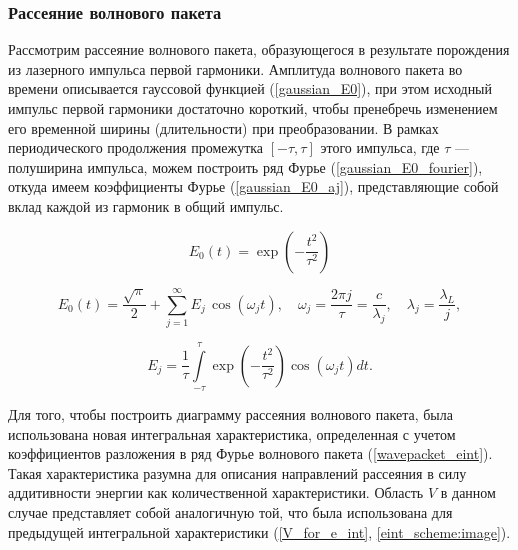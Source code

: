 \subsubsection{Рассеяние волнового пакета}

Рассмотрим рассеяние волнового пакета, образующегося в результате порождения из лазерного импульса первой гармоники. Амплитуда волнового пакета во времени описывается гауссовой функцией (\autoref{gaussian_E0}), при этом исходный импульс первой гармоники достаточно короткий, чтобы пренебречь изменением его временной ширины (длительности) при преобразовании. В рамках периодического продолжения промежутка $[-\tau, \tau]$ этого импульса, где $\tau$ --- полуширина импульса, можем построить ряд Фурье (\autoref{gaussian_E0_fourier}), откуда имеем коэффициенты Фурье (\autoref{gaussian_E0_aj}), представляющие собой вклад каждой из гармоник в общий импульс.

    \begin{equation}
        E_0\left( t \right) = \exp{\left( - \frac{t^2}{\tau^2}\right)}
        \label{gaussian_E0}
    \end{equation}

    \begin{equation}
        E_0\left( t \right) = \frac{\sqrt{\pi}}{2} + \sum_{j = 1}^{\infty}{ E_j \, \cos{\left(\omega_j t \right)}}, \quad \omega_j = \frac{2 \pi j}{\tau} = \frac{c}{\lambda_j}, \quad \lambda_{j} = \frac{\lambda_{L}}{j},
        \label{gaussian_E0_fourier}
    \end{equation}

    \begin{equation}
        E_j = \frac{1}{\tau} \int\limits_{-\tau}^{\tau}  \exp{\left( - \frac{t^2}{\tau^2}\right)} \cos{\left(\omega_j t \right)} dt.
        \label{gaussian_E0_aj}
    \end{equation}

Для того, чтобы построить диаграмму рассеяния волнового пакета, была использована новая интегральная характеристика, определенная с учетом коэффициентов разложения в ряд Фурье волнового пакета (\autoref{wavepacket_eint}). Такая характеристика разумна для описания направлений рассеяния в силу аддитивности энергии как количественной характеристики. Область $V$ в данном случае представляет собой аналогичную той, что была использована для предыдущей интегральной характеристики (\autoref{V_for_e_int}, \autoref{eint_scheme:image}).


